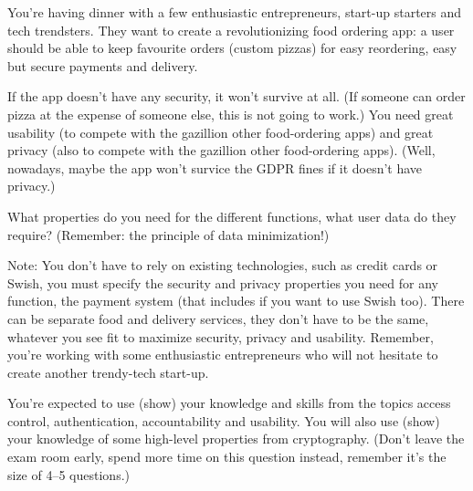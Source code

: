 \question[3]
You're having dinner with a few enthusiastic entrepreneurs, start-up starters 
and tech trendsters.
They want to create a revolutionizing food ordering app:
a user should be able to keep favourite orders (\eg custom pizzas) for easy 
reordering, easy but secure payments and delivery.

If the app doesn't have any security, it won't survive at all.
(If someone can order pizza at the expense of someone else, this is not going 
to work.)
You need great usability (to compete with the gazillion other food-ordering 
apps) and great privacy (also to compete with the gazillion other food-ordering 
apps).
(Well, nowadays, maybe the app won't survice the GDPR fines if it doesn't have 
privacy.)

What properties do you need for the different functions, what user data do they 
require?
(Remember: the principle of data minimization!)

Note: You don't have to rely on existing technologies, such as credit cards or 
Swish, you must specify the security and privacy properties you need for any 
function, \eg the payment system (that includes if you want to use Swish too).
There can be separate food and delivery services, they don't have to be the 
same, whatever you see fit to maximize security, privacy and usability.
Remember, you're working with some enthusiastic entrepreneurs who will not 
hesitate to create another trendy-tech start-up.

You're expected to use (\ie show) your knowledge and skills from the topics 
access control, authentication, accountability and usability.
You will also use (\ie show) your knowledge of some high-level properties from 
cryptography.
(Don't leave the exam room early, spend more time on this question instead, 
remember it's the size of 4--5 questions.)

